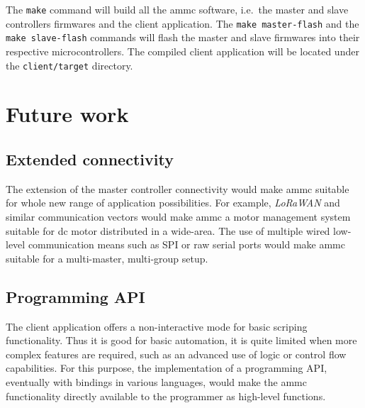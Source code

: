 The \texttt{make} command will build all the ammc software, i.e.\ the master
and slave controllers firmwares and the client application. The \texttt{make
master-flash} and the \texttt{make slave-flash} commands will flash the master
and slave firmwares into their respective microcontrollers. The compiled client
application will be located under the \texttt{client/target} directory.

\section{Future work}

\subsection{Extended connectivity}
The extension of the master controller connectivity would make ammc suitable
for whole new range of application possibilities. For example, \emph{LoRaWAN}
and similar communication vectors would make ammc a motor management system
suitable for dc motor distributed in a wide-area. The use of multiple wired
low-level communication means such as SPI or raw serial ports would make ammc
suitable for a multi-master, multi-group setup.

\subsection{Programming API}
The client application offers a non-interactive mode for basic scriping
functionality. Thus it is good for basic automation, it is quite limited when
more complex features are required, such as an advanced use of logic or control
flow capabilities. For this purpose, the implementation of a programming API,
eventually with bindings in various languages, would make the ammc
functionality directly available to the programmer as high-level functions.

